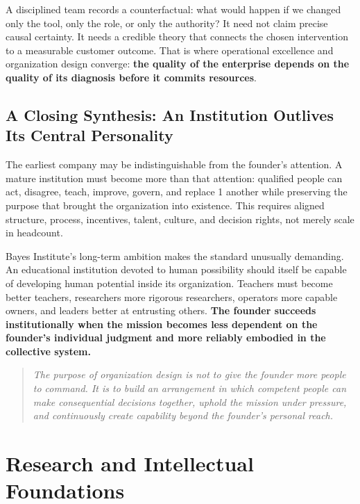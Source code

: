 A disciplined team records a counterfactual: what would happen if we changed only the tool, only the role, or only the authority? It need not claim precise causal certainty. It needs a credible theory that connects the chosen intervention to a measurable customer outcome. That is where operational excellence and organization design converge: \textbf{the quality of the enterprise depends on the quality of its diagnosis before it commits resources}.

\subsection{A Closing Synthesis: An Institution Outlives Its Central Personality}
\label{sec:closing_synthesis_institution}

The earliest company may be indistinguishable from the founder's attention. A mature institution must become more than that attention: qualified people can act, disagree, teach, improve, govern, and replace 1 another while preserving the purpose that brought the organization into existence. This requires aligned structure, process, incentives, talent, culture, and decision rights, not merely scale in headcount.

Bayes Institute's long-term ambition makes the standard unusually demanding. An educational institution devoted to human possibility should itself be capable of developing human potential inside its organization. Teachers must become better teachers, researchers more rigorous researchers, operators more capable owners, and leaders better at entrusting others. \textbf{The founder succeeds institutionally when the mission becomes less dependent on the founder's individual judgment and more reliably embodied in the collective system.}

\begin{quote}
\textit{The purpose of organization design is not to give the founder more people to command. It is to build an arrangement in which competent people can make consequential decisions together, uphold the mission under pressure, and continuously create capability beyond the founder's personal reach.}
\end{quote}

\section*{Research and Intellectual Foundations}

